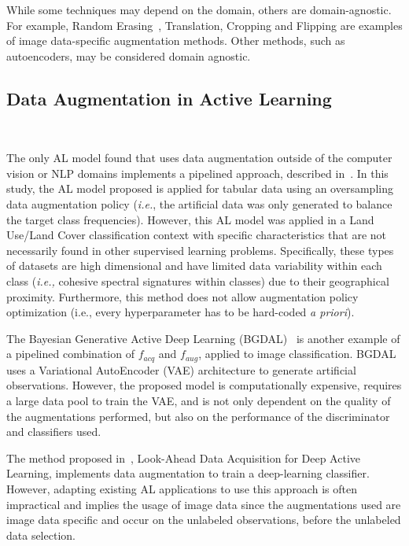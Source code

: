 While some techniques may depend on the domain, others are domain-agnostic.
For example, Random Erasing~\cite{Zhong2020}, Translation, Cropping and
Flipping are examples of image data-specific augmentation methods. Other
methods, such as autoencoders, may be considered domain agnostic.

\subsection{Data Augmentation in Active Learning
}~\label{sec:data_augmentation_in_al-al-aug}

The only AL model found that uses data augmentation outside of the computer
vision or NLP domains implements a pipelined approach, described
in~\cite{Fonseca2021al}. In this study, the AL model proposed is applied for
tabular data using an oversampling data augmentation policy (\textit{i.e.},
the artificial data was only generated to balance the target class
frequencies). However, this AL model was applied in a Land Use/Land Cover
classification context with specific characteristics that are not necessarily
found in other supervised learning problems. Specifically, these types of
datasets are high dimensional and have limited data variability within each
class (\textit{i.e.,} cohesive spectral signatures within classes) due to
their geographical proximity. Furthermore, this method does not allow
augmentation policy optimization (i.e., every hyperparameter has to be
hard-coded \textit{a priori}).

The Bayesian Generative Active Deep Learning (BGDAL)~\cite{tran2019bayesian}
is another example of a pipelined combination of $f_{acq}$ and $f_{aug}$,
applied to image classification. BGDAL uses a Variational AutoEncoder (VAE)
architecture to generate artificial observations. However, the proposed model
is computationally expensive, requires a large data pool to train the VAE, and
is not only dependent on the quality of the augmentations performed, but also
on the performance of the discriminator and classifiers used.

The method proposed in~\cite{Kim2021}, Look-Ahead Data Acquisition for Deep
Active Learning, implements data augmentation to train a deep-learning
classifier. However, adapting existing AL applications to use this approach is
often impractical and implies the usage of image data since the augmentations
used are image data specific and occur on the unlabeled observations, before
the unlabeled data selection.

